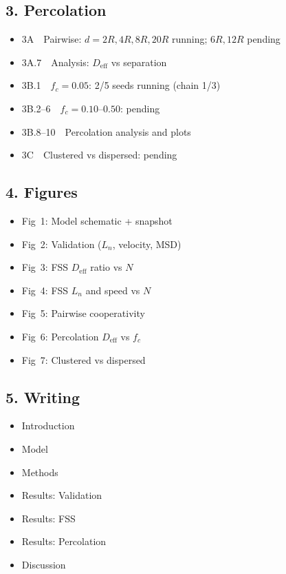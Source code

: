 \documentclass[aps,pre,twocolumn,superscriptaddress,longbibliography,floatfix]{revtex4-2}
\newcommand{\Deff}{D_{\mathrm{eff}}}       %
\newcommand{\fc}{f_c}                      %
\begin{document}
\subsection*{3. Percolation}
\begin{itemize}
\item[$\sim$] 3A~~Pairwise: $d=2R,4R,8R,20R$ running; $6R,12R$ pending
\item[$\square$] 3A.7~~Analysis: $\Deff$ vs separation
\item[$\sim$] 3B.1~~$\fc=0.05$: 2/5 seeds running (chain 1/3)
\item[$\square$] 3B.2--6~~$\fc=0.10$--$0.50$: pending
\item[$\square$] 3B.8--10~~Percolation analysis and plots
\item[$\square$] 3C~~Clustered vs dispersed: pending
\end{itemize}

\subsection*{4. Figures}
\begin{itemize}
\item[$\square$] Fig~1: Model schematic + snapshot
\item[$\square$] Fig~2: Validation ($L_n$, velocity, MSD)
\item[$\square$] Fig~3: FSS $\Deff$ ratio vs $N$
\item[$\square$] Fig~4: FSS $L_n$ and speed vs $N$
\item[$\square$] Fig~5: Pairwise cooperativity
\item[$\square$] Fig~6: Percolation $\Deff$ vs $\fc$
\item[$\square$] Fig~7: Clustered vs dispersed
\end{itemize}

\subsection*{5. Writing}
\begin{itemize}
\item[$\sim$] Introduction ~~\item[$\sim$] Model ~~\item[$\square$] Methods
\item[$\square$] Results: Validation ~~\item[$\square$] Results: FSS
\item[$\square$] Results: Percolation ~~\item[$\square$] Discussion
\end{itemize}
\endgroup
\twocolumngrid
\end{document}
